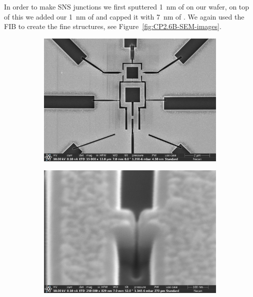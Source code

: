 In order to make SNS junctions we first sputtered \qty{1}{\nano\meter} of  on our  wafer, on top of this we added our \qty{1}{\nano\meter} of  and capped it with \qty{7}{\nano\meter} of . We again used the FIB to create the fine structures, see Figure~\ref{fig:CP2.6B-SEM-images}.

\begin{figure}[ht]
	\begin{subfigure}[t]{0.3\textwidth}
		\centering
		\includegraphics[width=\textwidth]{figures/samples/CP2/CP2.6B_SEM_overview.jpg}
	\end{subfigure}
	\hfill
	\begin{subfigure}[t]{0.3\textwidth}
		\centering
		\includegraphics[width=\textwidth]{figures/samples/CP2/CP2.6B_SEM_junction.jpg}

\end{subfigure}
\end{figure}
